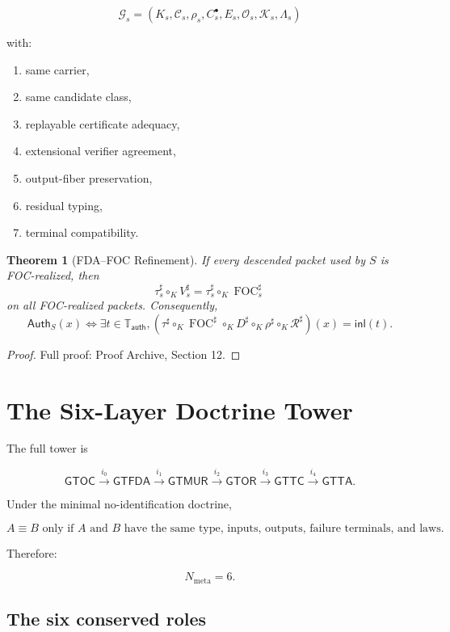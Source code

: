 \documentclass[11pt]{article}
\newtheorem{theorem}{Theorem}[section]
\begin{document}
\[
\mathcal G_s=(K_s,\mathcal C_s,\rho_s,C_s^\bullet,E_s,\mathcal O_s,\mathcal K_s,\Lambda_s)
\]

with:

\begin{enumerate}
    \item same carrier,
    \item same candidate class,
    \item replayable certificate adequacy,
    \item extensional verifier agreement,
    \item output-fiber preservation,
    \item residual typing,
    \item terminal compatibility.
\end{enumerate}

\begin{theorem}[FDA--FOC Refinement] \label{thm:fda_foc_refinement}
If every descended packet used by \(S\) is FOC-realized, then
\[
\boxed{
\tau_s^\sharp\circ_KV_s^\sharp
=
\tau_s^\sharp\circ_K\operatorname{FOC}_s^\sharp
}
\]
on all FOC-realized packets. Consequently,
\[
\boxed{
\mathsf{Auth}_S(x)
\iff
\exists t\in\mathbb T_{\mathsf{auth}},
(\tau^\sharp\circ_K \operatorname{FOC}^\sharp\circ_K D^\sharp\circ_K \rho^\sharp\circ_K \mathcal R^\sharp)(x)=\mathsf{inl}(t).
}
\]
\end{theorem}

\begin{proof}
Full proof: Proof Archive, Section 12.
\end{proof}

\section{The Six-Layer Doctrine Tower}

The full tower is

\[
\boxed{
\mathsf{GTOC}
\xrightarrow{i_0}
\mathsf{GTFDA}
\xrightarrow{i_1}
\mathsf{GTMUR}
\xrightarrow{i_2}
\mathsf{GTOR}
\xrightarrow{i_3}
\mathsf{GTTC}
\xrightarrow{i_4}
\mathsf{GTTA}.
}
\]

Under the minimal no-identification doctrine,

\[
\boxed{
A\equiv B
\text{ only if }A\text{ and }B\text{ have the same type, inputs, outputs, failure terminals, and laws.}
}
\]

Therefore:

\[
\boxed{
N_{\mathrm{meta}}=6.
}
\]

\subsection{The six conserved roles}
\end{document}
